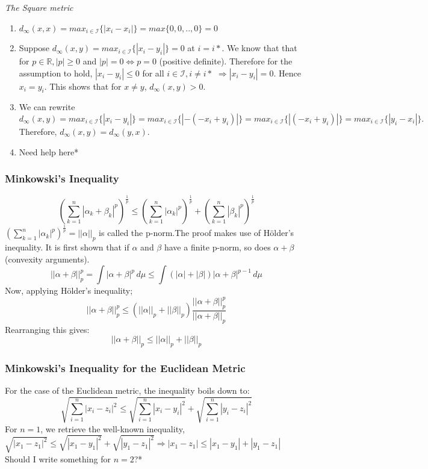 \begin{frame}
\textit{The Square metric}\hfill\break
\begin{enumerate}
    \item $d_{\infty}(x,x) = max_{i\in \mathcal{I}}\{|x_i - x_i|\} = max\{0,
    0,..,0\} = 0$
    \item Suppose $d_{\infty}(x,y) = max_{i\in \mathcal{I}}\{|x_i - y_i|\} = 0$
    at $i=i*$. We know that that for $p \in \mathbb{R}, |p|\geq 0$ and $|p| = 0
    \iff p = 0$ (positive definite). Therefore for the assumption to hold, $|x_i
    - y_i| \leq 0$ for all $i \in \mathcal{I}, i\neq i*$ $\Rightarrow |x_i -
    y_i| = 0$. Hence $x_i = y_i$. This shows that
    for $x\neq y$, $d_{\infty}(x,y)>0$.
    \item We can rewrite $d_{\infty}(x,y) = max_{i\in \mathcal{I}}\{|x_i -
    y_i|\} = max_{i\in \mathcal{I}}\{|- (- x_i + y_i)|\} = max_{i\in
    \mathcal{I}}\{|(- x_i + y_i)|\} = max_{i\in \mathcal{I}}\{|y_i - x_i|\}.$
    Therefore, $d_{\infty}(x,y) = d_{\infty}(y,x).$
    \item Need help here*
\end{enumerate}
\end{frame}

\begin{frame}
\frametitle{Minkowski's Inequality}
\begin{equation*}
    (\sum_{k=1}^{n}|\alpha_k+\beta_k|^p)^\frac{1}{p} \leq (\sum_{k=1}^{n}|\alpha_k|^p)^\frac{1}{p} + (\sum_{k=1}^{n}|\beta_k|^p)^\frac{1}{p}
\end{equation*}
$(\sum_{k=1}^{n}|\alpha_k|^p)^\frac{1}{p} = ||\alpha||_p$ is called the
p-norm.The proof makes use of H\"older's inequality. It is first shown that if
$\alpha$ and $\beta$ have a finite p-norm, so does $\alpha+\beta$ (convexity
arguments).
\begin{equation*}
    ||\alpha+\beta||_p^p = \int |\alpha+\beta|^p \,d\mu \leq \int (|\alpha|+|\beta|)|\alpha+\beta|^{p-1} \,d\mu
\end{equation*}
Now, applying H\"older's inequality;
\begin{equation*}
||\alpha+\beta||_p^p \leq  (||\alpha||_p+||\beta||_p)\frac{||\alpha+\beta||_p^p}{||\alpha+\beta||_p}
\end{equation*}
Rearranging this gives:
\begin{equation*}
||\alpha+\beta||_p \leq  ||\alpha||_p+||\beta||_p
\end{equation*}
\end{frame}

\begin{frame}
\frametitle{Minkowski's Inequality for the Euclidean Metric}
For the case of the Euclidean metric, the inequality boils down to:
\begin{equation*}
    \sqrt{\sum_{i=1}^{n} |x_i - z_i|^2} \leq  \sqrt{\sum_{i=1}^{n} |x_i - y_i|^2} +  \sqrt{\sum_{i=1}^{n} |y_i - z_i|^2}
\end{equation*}
For $n=1$, we retrieve the well-known inequality, 
$\sqrt{|x_1 - z_1|^2} \leq  \sqrt{|x_1 - y_1|^2} +  \sqrt{|y_1 - z_1|^2}
\Rightarrow|x_1 - z_1|\leq |x_1 - y_1|+|y_1 - z_1|$ \hfill\break
Should I write something for $n=2$?*
\end{frame}